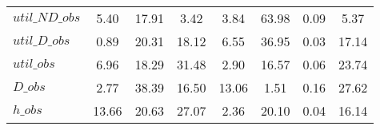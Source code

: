 \begin{center}
\begin{longtable}{lccccccc}
$util\_ND\_obs  $	 & 	         5.40	 & 	        17.91	 & 	         3.42	 & 	         3.84	 & 	        63.98	 & 	         0.09	 & 	         5.37 \\ 
$util\_D\_obs   $	 & 	         0.89	 & 	        20.31	 & 	        18.12	 & 	         6.55	 & 	        36.95	 & 	         0.03	 & 	        17.14 \\ 
$util\_obs      $	 & 	         6.96	 & 	        18.29	 & 	        31.48	 & 	         2.90	 & 	        16.57	 & 	         0.06	 & 	        23.74 \\ 
$D\_obs         $	 & 	         2.77	 & 	        38.39	 & 	        16.50	 & 	        13.06	 & 	         1.51	 & 	         0.16	 & 	        27.62 \\ 
$h\_obs         $	 & 	        13.66	 & 	        20.63	 & 	        27.07	 & 	         2.36	 & 	        20.10	 & 	         0.04	 & 	        16.14 \\ 
\end{longtable}
 \end{center}
